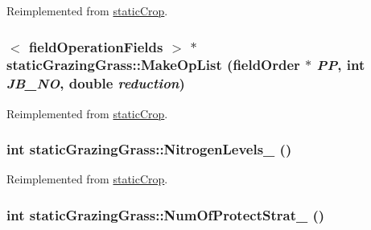 Reimplemented from \hyperlink{classstatic_crop_ac8b14325e2ab05247e9b61e3af331f24}{staticCrop}.\hypertarget{classstatic_grazing_grass_ae65c2c9e795f4aa3c7d0f52703e4064a}{
\subsubsection[{MakeOpList}]{$<$ {\bf fieldOperationFields} $>$ $\ast$ staticGrazingGrass::MakeOpList ({\bf fieldOrder} $\ast$ {\em PP}, \/  int {\em JB\_\-NO}, \/  double {\em reduction})}}
\label{classstatic_grazing_grass_ae65c2c9e795f4aa3c7d0f52703e4064a}


Reimplemented from \hyperlink{classstatic_crop_a9b67ef1ae531a3afb32b63a4aeb5916b}{staticCrop}.\hypertarget{classstatic_grazing_grass_a0bb3e51f30d7b787e285f5a630a6ea47}{
\subsubsection[{NitrogenLevels\_\-}]{\setlength{\rightskip}{0pt plus 5cm}int staticGrazingGrass::NitrogenLevels\_\- ()}}
\label{classstatic_grazing_grass_a0bb3e51f30d7b787e285f5a630a6ea47}


Reimplemented from \hyperlink{classstatic_crop_a32b69ed138beaed150efa74d18e82d8e}{staticCrop}.\hypertarget{classstatic_grazing_grass_a07b29d7ed9e20b7ca1f2fbb82a851458}{
\subsubsection[{NumOfProtectStrat\_\-}]{\setlength{\rightskip}{0pt plus 5cm}int staticGrazingGrass::NumOfProtectStrat\_\- ()}}
\label{classstatic_grazing_grass_a07b29d7ed9e20b7ca1f2fbb82a851458}


